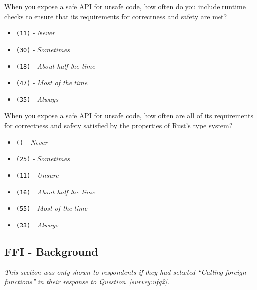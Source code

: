 \begin{protocol}
\item \label{survey:esaq1}  When you expose a safe API for unsafe code, how often do you include runtime checks to ensure that its requirements for correctness and safety are met?
\begin{itemize}
\item \texttt{(11)} - \textit{Never}
\item \texttt{(30)} - \textit{Sometimes}
\item \texttt{(18)} - \textit{About half the time}
\item \texttt{(47)} - \textit{Most of the time}
\item \texttt{(35)} - \textit{Always}
\end{itemize}
\item \label{survey:esaq2}  When you expose a safe API for unsafe code, how often are all of its requirements for correctness and safety satisfied by the properties of Rust's type system?
\begin{itemize}
\item \texttt{()} - \textit{Never}
\item \texttt{(25)} - \textit{Sometimes}
\item \texttt{(11)} - \textit{Unsure}
\item \texttt{(16)} - \textit{About half the time}
\item \texttt{(55)} - \textit{Most of the time}
\item \texttt{(33)} - \textit{Always}
\end{itemize}
\end{protocol}

\subsection{FFI - Background}
\label{survey:sec:ffibq}
\textit{This section was only shown to respondents if they had selected ``\textit{Calling foreign functions}'' in their response to Question~\ref{survey:ufq2}.}

